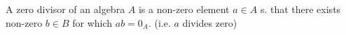 \begin{definition}\label{d:zero-divisor}
	A zero divisor of an algebra $A$ is a non-zero element $a \in A$ s. that there exists non-zero $b \in B$ for which $ab = 0_A$. (i.e. $a$ divides zero)
\end{definition}
